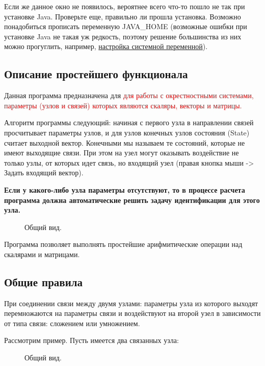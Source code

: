 \documentclass{article}
\numberwithin{equation}{section}
\begin{document}
Если же данное окно не появилось, вероятнее всего что-то пошло не так при установке Java. Проверьте еще, правильно ли прошла установка. Возможно понадобиться прописать переменную JAVA\_HOME (возможные ошибки при установке Java не такая уж редкость, поэтому решение большинства из них можно прогуглить, например, \href{https://www.java.com/ru/download/help/path.xml}{настройка системной переменной}).

\subsection{Описание простейшего функционала}
\qquad Данная программа предназначена для \textcolor{red}{для работы с окрестностными системами, параметры (узлов и связей) которых являются скаляры, векторы и матрицы.}

Алгоритм программы следующий: начиная с первого узла в направлении связей просчитывает параметры узлов, и для узлов конечных узлов состояния (State) считает выходной вектор. Конечными мы называем те состояний, которые не имеют выходящие связи. При этом на узел могут оказывать воздействие не только узлы, от которых идет связь, но входящий узел (правая кнопка мыши -> Задать входящий вектор).

{\textbf{ Если у какого-либо узла параметры отсутствуют, то в процессе расчета программа должна автоматические решить задачу идентификации для этого узла.}}


\begin{figure}[h]
\caption{Общий вид.}
\label{ris:image2}
\end{figure}


Программа позволяет выполнять простейшие арифмитические операции над скалярами и матрицами.

\subsection{Общие правила} 

	\qquad При соединении связи между двумя узлами: параметры узла из которого выходят перемножаются на параметры связи и воздействуют на второй узел в зависимости от типа связи: сложением или умножением.

	
Рассмотрим пример. Пусть имеется два связанных узла:
	
	\begin{figure}[h]
\caption{Общий вид.}
\label{ris:image3}
\end{figure}
	
\end{document}
